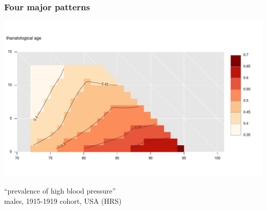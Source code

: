 \documentclass[20pt]{beamer}
\begin{document}
\begin{frame}
\frametitle{Four major patterns}
\begin{centering}
\includegraphics[scale=.95]{Figures/Figure4b.pdf}\\
\end{centering}
``prevalence of high blood pressure''\\
males, 1915-1919 cohort, USA (HRS)
\end{frame}
\end{document}
